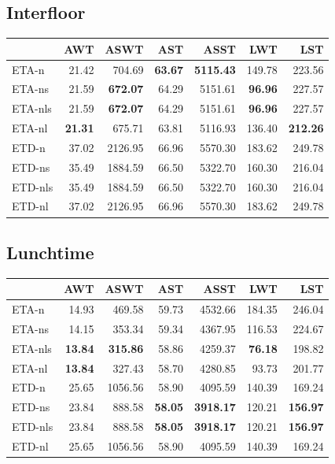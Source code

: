 \documentclass{UoYCSproject}
\begin{document}
\begin{appendices}
\subsection{Interfloor}
\begin{tabular}{l | r r r r r r}
	& AWT & ASWT & AST & ASST & LWT & LST \\
	\hline
    ETA-n & 21.42 & 704.69 & \textbf{63.67} & \textbf{5115.43} & 149.78 & 223.56 \\
    ETA-ns & 21.59 & \textbf{672.07} & 64.29 & 5151.61 & \textbf{96.96} & 227.57 \\
    ETA-nls & 21.59 & \textbf{672.07} & 64.29 & 5151.61 & \textbf{96.96} & 227.57 \\
    ETA-nl & \textbf{21.31} & 675.71 & 63.81 & 5116.93 & 136.40 & \textbf{212.26} \\
    ETD-n & 37.02 & 2126.95 & 66.96 & 5570.30 & 183.62 & 249.78 \\
    ETD-ns & 35.49 & 1884.59 & 66.50 & 5322.70 & 160.30 & 216.04 \\
    ETD-nls & 35.49 & 1884.59 & 66.50 & 5322.70 & 160.30 & 216.04 \\
    ETD-nl & 37.02 & 2126.95 & 66.96 & 5570.30 & 183.62 & 249.78
\end{tabular}

\subsection{Lunchtime}
\begin{tabular}{l | r r r r r r}
	& AWT & ASWT & AST & ASST & LWT & LST \\
	\hline
    ETA-n & 14.93 & 469.58 & 59.73 & 4532.66 & 184.35 & 246.04 \\
    ETA-ns & 14.15 & 353.34 & 59.34 & 4367.95 & 116.53 & 224.67 \\
    ETA-nls & \textbf{13.84} & \textbf{315.86} & 58.86 & 4259.37 & \textbf{76.18} & 198.82 \\
    ETA-nl & \textbf{13.84} & 327.43 & 58.70 & 4280.85 & 93.73 & 201.77 \\
    ETD-n & 25.65 & 1056.56 & 58.90 & 4095.59 & 140.39 & 169.24 \\
    ETD-ns & 23.84 & 888.58 & \textbf{58.05} & \textbf{3918.17} & 120.21 & \textbf{156.97} \\
    ETD-nls & 23.84 & 888.58 & \textbf{58.05} & \textbf{3918.17} & 120.21 & \textbf{156.97} \\
    ETD-nl & 25.65 & 1056.56 & 58.90 & 4095.59 & 140.39 & 169.24
\end{tabular}

\end{appendices}
\end{document}
